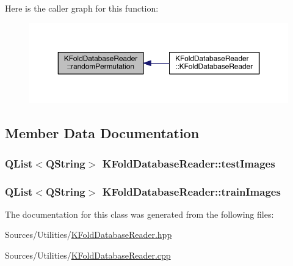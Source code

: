 Here is the caller graph for this function\+:\nopagebreak
\begin{figure}[H]
\begin{center}
\leavevmode
\includegraphics[width=350pt]{class_k_fold_database_reader_a2f8223aae421c533d260b5d6e65c09e8_icgraph}
\end{center}
\end{figure}




\subsection{Member Data Documentation}
\hypertarget{class_k_fold_database_reader_a224507fbe965e1fb12089fb572d72681}{
\subsubsection[{test\+Images}]{\setlength{\rightskip}{0pt plus 5cm}Q\+List$<$Q\+String$>$ K\+Fold\+Database\+Reader\+::test\+Images\hspace{0.3cm}{\ttfamily [private]}}}\label{class_k_fold_database_reader_a224507fbe965e1fb12089fb572d72681}
\hypertarget{class_k_fold_database_reader_a93461f0d927f76d6dad7af885e16b172}{
\subsubsection[{train\+Images}]{\setlength{\rightskip}{0pt plus 5cm}Q\+List$<$Q\+String$>$ K\+Fold\+Database\+Reader\+::train\+Images\hspace{0.3cm}{\ttfamily [private]}}}\label{class_k_fold_database_reader_a93461f0d927f76d6dad7af885e16b172}


The documentation for this class was generated from the following files\+:\begin{DoxyCompactItemize}
\item 
Sources/\+Utilities/\hyperlink{_k_fold_database_reader_8hpp}{K\+Fold\+Database\+Reader.\+hpp}\item 
Sources/\+Utilities/\hyperlink{_k_fold_database_reader_8cpp}{K\+Fold\+Database\+Reader.\+cpp}\end{DoxyCompactItemize}
